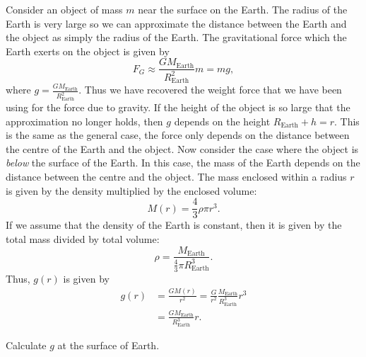 \documentclass[../classical_mechanics.tex]{subfiles}
\begin{document}
        Consider an object of mass $m$ near the surface on the Earth.
        The radius of the Earth is very large so we can approximate the distance between the Earth and the object as simply the radius of the Earth.
        The gravitational force which the Earth exerts on the object is given by
        \begin{equation}
            F_G\approx\frac{GM_\text{Earth}}{R_\text{Earth}^2}m=mg,
        \end{equation}
        where $g=\frac{GM_\text{Earth}}{R_\text{Earth}^2}$.
        Thus we have recovered the weight force that we have been using for the force due to gravity.
        If the height of the object is so large that the approximation no longer holds, then $g$ depends on the height $R_\text{Earth}+h=r$.
        This is the same as the general case, the force only depends on the distance between the centre of the Earth and the object.
        Now consider the case where the object is \textit{below} the surface of the Earth.
        In this case, the mass of the Earth depends on the distance between the centre and the object.
        The mass enclosed within a radius $r$ is given by the density multiplied by the enclosed volume:
        \begin{equation}
            M(r)=\frac{4}{3}\rho\pi r^3.
        \end{equation}
        If we assume that the density of the Earth is constant, then it is given by the total mass divided by total volume:
        \begin{equation}
            \rho=\frac{M_\text{Earth}}{\frac{4}{3}\pi R_\text{Earth}^3}.
        \end{equation}
        Thus, $g(r)$ is given by
        \begin{align}
            g(r)&=\frac{GM(r)}{r^2}=\frac{G}{r^2}\frac{M_\text{Earth}}{R_\text{Earth}^3}r^3\\
            &=\frac{GM_\text{Earth}}{R_\text{Earth}^3}r.
        \end{align}
        \begin{example}
            Calculate $g$ at the surface of Earth.
        \end{example}
        
\end{document}
